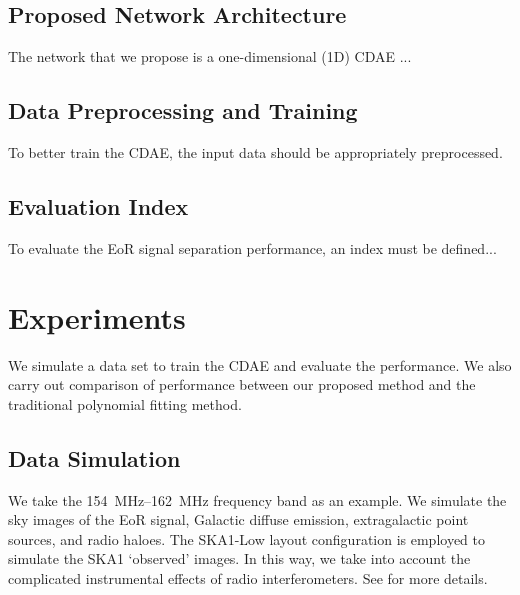 \documentclass[letters,a4paper,fleqn,usenatbib]{mnras}
\begin{document}
\subsection{Proposed Network Architecture}
\label{sec:architecture}

The network that we propose is a one-dimensional (1D) CDAE ...


\subsection{Data Preprocessing and Training}
\label{sec:data}

To better train the CDAE, the input data should be appropriately
preprocessed.


\subsection{Evaluation Index}
\label{sec:index}

To evaluate the EoR signal separation performance, an index must be defined...


\section{Experiments}
\label{sec:expriments}

We simulate a data set to train the CDAE and evaluate the performance.
We also carry out comparison of performance between our proposed method
and the traditional polynomial fitting method.


\subsection{Data Simulation}
\label{sec:simulation}

We take the \SIrange{154}{162}{\MHz} frequency band as an example.
We simulate the sky images of the EoR signal, Galactic diffuse emission,
extragalactic point sources, and radio haloes.
The SKA1-Low layout configuration is employed to simulate the SKA1
`observed' images.
In this way, we take into account the complicated instrumental effects
of radio interferometers.
See \citealt{li2018} for more details.
\end{document}
